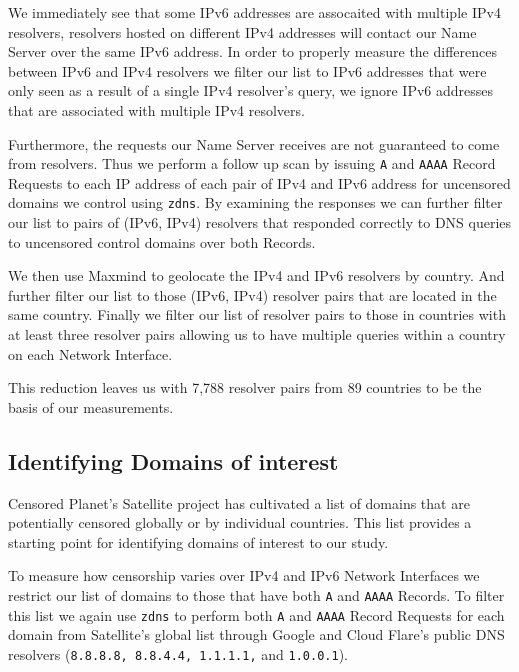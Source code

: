 We immediately see that some IPv6 addresses are assocaited with multiple IPv4
resolvers, \ie resolvers hosted on different IPv4 addresses will contact our Name
Server over the same IPv6 address. In order to properly measure the differences
between IPv6 and IPv4 resolvers we filter our list to IPv6 addresses that were
only seen as a result of a single IPv4 resolver's query, \ie we ignore IPv6
addresses that are associated with multiple IPv4 resolvers.

Furthermore, the requests our Name Server receives are not guaranteed to come
from resolvers. Thus we perform a follow up scan by issuing \texttt{A} and
\texttt{AAAA} Record Requests to each IP address of each pair of IPv4 and IPv6
address for uncensored domains we control using \texttt{zdns}. By
examining the responses we can further filter our list to pairs of (IPv6, IPv4)
resolvers that responded correctly to DNS queries to uncensored control domains
over both Records.

We then use Maxmind to geolocate the IPv4 and IPv6 resolvers by
country. And further filter our list to those (IPv6, IPv4) resolver pairs that
are located in the same country. Finally we filter our list of resolver pairs to
those in countries with at least three resolver pairs allowing us to have
multiple queries within a country on each Network Interface.

This reduction leaves us with 7,788 resolver pairs from 89 countries to be the
basis of our measurements.


\subsection{Identifying Domains of interest}\label{ssec:censored-domains}

Censored Planet's Satellite project has cultivated a list of domains
that are potentially censored globally or by individual countries. This list
provides a starting point for identifying domains of interest to our study.

To measure how censorship varies over IPv4 and IPv6 Network Interfaces we
restrict our list of domains to those that have both \texttt{A} and
\texttt{AAAA} Records. To filter this list we again use \texttt{zdns} to perform
both \texttt{A} and \texttt{AAAA} Record Requests for each domain from
Satellite's global list through Google and Cloud Flare's public DNS resolvers
(\texttt{8.8.8.8, 8.8.4.4, 1.1.1.1,} and \texttt{1.0.0.1}).

